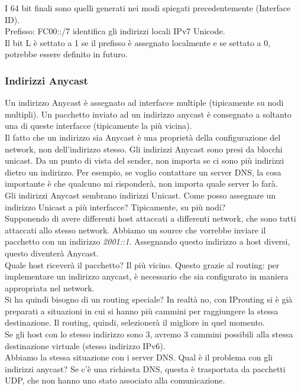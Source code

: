 \documentclass{article}
\begin{document}
I 64 bit finali sono quelli generati nei modi spiegati precedentemente (Interface ID). \\ Prefisso: FC00::/7 identifica gli indirizzi locali IPv7 Unicode. \\ Il bit L è settato a 1 se il prefisso è assegnato localmente e se settato a 0, potrebbe essere definito in futuro.

\subsubsection{Indirizzi Anycast}
Un indirizzo Anycast è assegnato ad interfacce multiple (tipicamente su nodi multipli). Un pacchetto inviato ad un indirizzo anycast è consegnato a soltanto una di queste interfacce (tipicamente la più vicina). \\ Il fatto che un indirizzo sia Anycast è una proprietà della configurazione del network, non dell'indirizzo stesso. Gli indirizzi Anycast sono presi da blocchi unicast. Da un punto di vista del sender, non importa se ci sono più indirizzi dietro un indirizzo. Per esempio, se voglio contattare un server DNS, la cosa importante è che qualcuno mi risponderà, non importa quale server lo farà. \\ Gli indirizzi Anycast sembrano indirizzi Unicast. Come posso assegnare un indirizzo Unicast a più interfacce? Tipicamente, su più nodi? \\ Supponendo di avere differenti host attaccati a differenti network, che sono tutti attaccati allo stesso network. Abbiamo un source che vorrebbe inviare il pacchetto con un indirizzo \textit{2001::1}. Assegnando questo indirizzo a host diversi, questo diventerà Anycast. \\ Quale host riceverà il pacchetto? Il più vicino. Questo grazie al routing: per implementare un indirizzo anycast, è necessario che sia configurato in maniera appropriata nel network. \\ Si ha quindi bisogno di un routing speciale? In realtà no, con IProuting si è già preparati a situazioni in cui si hanno più cammini per raggiungere la stessa destinazione. Il routing, quindi, selezionerà il migliore in quel momento. \\ Se gli host con lo stesso indirizzo sono 3, avremo 3 cammini possibili alla stessa destinazione virtuale (stesso indirizzo IPv6). \\ Abbiamo la stessa situazione con i server DNS. Qual è il problema con gli indirizzi anycast? Se c'è una richiesta DNS, questa è trasportata da pacchetti UDP, che non hanno uno stato associato alla comunicazione.
\end{document}
